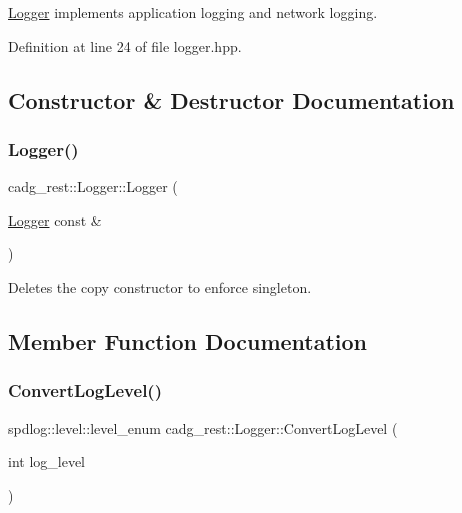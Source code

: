 \mbox{\hyperlink{classcadg__rest_1_1_logger}{Logger}} implements application logging and network logging. 

Definition at line 24 of file logger.\+hpp.



\subsection{Constructor \& Destructor Documentation}
\mbox{\label{classcadg__rest_1_1_logger_a203a00818fd2c6c1f901759772e61e1d}} 
\subsubsection{\texorpdfstring{Logger()}{Logger()}}
{\footnotesize\ttfamily cadg\+\_\+rest\+::\+Logger\+::\+Logger (\begin{DoxyParamCaption}\item[{\mbox{\hyperlink{classcadg__rest_1_1_logger}{Logger}} const \&}]{ }\end{DoxyParamCaption})\hspace{0.3cm}{\ttfamily [delete]}}



Deletes the copy constructor to enforce singleton. 



\subsection{Member Function Documentation}
\mbox{\label{classcadg__rest_1_1_logger_a16fc28a4f058a0ccfccd894925668021}} 
\subsubsection{\texorpdfstring{ConvertLogLevel()}{ConvertLogLevel()}}
{\footnotesize\ttfamily spdlog\+::level\+::level\+\_\+enum cadg\+\_\+rest\+::\+Logger\+::\+Convert\+Log\+Level (\begin{DoxyParamCaption}\item[{int}]{log\+\_\+level }\end{DoxyParamCaption})\hspace{0.3cm}{\ttfamily [protected]}}




